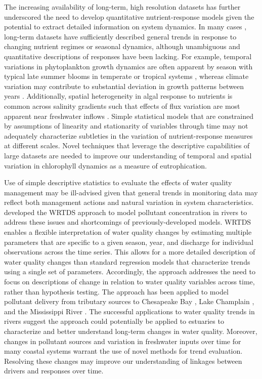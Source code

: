 \documentclass[letterpaper,12pt,oneside]{article}\usepackage[]{graphicx}\usepackage[]{color}
\begin{document}
The increasing availability of long-term, high resolution datasets has further underscored the need to develop quantitative nutrient-response models given the potential to extract detailed information on system dynamics.  In many cases \citep[e.g.,][]{Caffrey03, Greening06}, long-term datasets have sufficiently described general trends in response to changing nutrient regimes or seasonal dynamics, although unambiguous and quantitative descriptions of responses have been lacking.  For example, temporal variations in phytoplankton growth dynamics are often apparent by season with typical late summer blooms in temperate or tropical systems \citep{Cloern96}, whereas climate variation may contribute to substantial deviation in growth patterns between years \citep{Jassby02}.  Additionally, spatial heterogeneity in algal response to nutrients is common across salinity gradients such that effects of flux variation are most apparent near freshwater inflows \citep{Cloern96}.  Simple statistical models that are constrained by assumptions of linearity and stationarity  of variables through time may not adequately characterize subtleties in the variation of nutrient-response measures at different scales.  Novel techniques that leverage the descriptive capabilities of large datasets are needed to improve our understanding of temporal and spatial variation in chlorophyll dynamics as a measure of eutrophication.

Use of simple descriptive statistics to evaluate the effects of water quality management may be ill-advised given that general trends in monitoring data may reflect both management actions and natural variation in system characteristics.  \citet{Hirsch10} developed the \ac{WRTDS} approach to model pollutant concentration in rivers to address these issues and shortcomings of previously-developed models.  \ac{WRTDS} enables a flexible interpretation of water quality changes by estimating multiple parameters that are specific to a given season, year, and discharge for individual observations across the time series.  This allows for a more detailed description of water quality changes than standard regression models that characterize trends using a single set of parameters.  Accordingly, the approach addresses the need to focus on descriptions of change in relation to water quality variables across time, rather than hypothesis testing. The approach has been applied to model pollutant delivery from tributary sources to Chesapeake Bay \citep{Hirsch10,Moyer12,Zhang13}, Lake Champlain \citep{Medalie12}, and the Mississippi River \citep{Sprague11}.  The successful applications to water quality trends in rivers suggest the approach could potentially be applied to estuaries to characterize and better understand long-term changes in water quality.  Moreover, changes in pollutant sources and variation in freshwater inputs over time for many coastal systems warrant the use of novel methods for trend evaluation.  Resolving these changes may improve our understanding of linkages between drivers and responses over time. 
\end{document}
